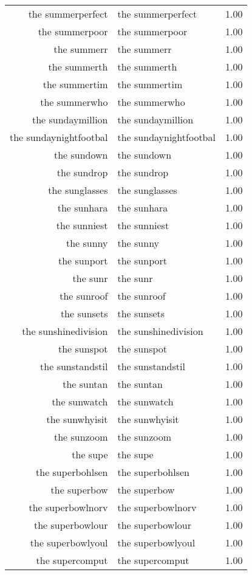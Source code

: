 \begin{table}[ht]
\begin{tabular}{rlr}
  the summerperfect & the summerperfect & 1.00 \\ 
  the summerpoor & the summerpoor & 1.00 \\ 
  the summerr & the summerr & 1.00 \\ 
  the summerth & the summerth & 1.00 \\ 
  the summertim & the summertim & 1.00 \\ 
  the summerwho & the summerwho & 1.00 \\ 
  the sundaymillion & the sundaymillion & 1.00 \\ 
  the sundaynightfootbal & the sundaynightfootbal & 1.00 \\ 
  the sundown & the sundown & 1.00 \\ 
  the sundrop & the sundrop & 1.00 \\ 
  the sunglasses & the sunglasses & 1.00 \\ 
  the sunhara & the sunhara & 1.00 \\ 
  the sunniest & the sunniest & 1.00 \\ 
  the sunny & the sunny & 1.00 \\ 
  the sunport & the sunport & 1.00 \\ 
  the sunr & the sunr & 1.00 \\ 
  the sunroof & the sunroof & 1.00 \\ 
  the sunsets & the sunsets & 1.00 \\ 
  the sunshinedivision & the sunshinedivision & 1.00 \\ 
  the sunspot & the sunspot & 1.00 \\ 
  the sunstandstil & the sunstandstil & 1.00 \\ 
  the suntan & the suntan & 1.00 \\ 
  the sunwatch & the sunwatch & 1.00 \\ 
  the sunwhyisit & the sunwhyisit & 1.00 \\ 
  the sunzoom & the sunzoom & 1.00 \\ 
  the supe & the supe & 1.00 \\ 
  the superbohlsen & the superbohlsen & 1.00 \\ 
  the superbow & the superbow & 1.00 \\ 
  the superbowlnorv & the superbowlnorv & 1.00 \\ 
  the superbowlour & the superbowlour & 1.00 \\ 
  the superbowlyoul & the superbowlyoul & 1.00 \\ 
  the supercomput & the supercomput & 1.00 \\ 

\end{tabular}
\end{table}
